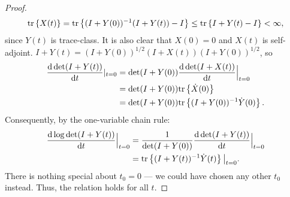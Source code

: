 \begin{proof}
  \begin{align*}
    \textup{tr}\left \{X(t) \right \} = \textup{tr}\left \{(I+Y(0))^{-1} (I+Y(t)) - I \right \}
    \leq \textup{tr}\left \{I+Y(t) - I \right \}< \infty,
  \end{align*}
  since $Y(t)$ is trace-class. It is also clear that
  $X(0) = 0$ and $X(t)$ is self-adjoint.
  $I+Y(t) = (I+Y(0))^{1/2}(I+X(t))(I+Y(0))^{1/2}$, so
  \begin{align*}
    \frac{\text{\textup{d}} \det (I+Y(t))}{\text{\textup{d}} t}|_{t=0} 
    &= \det (I+Y(0))\frac{\text{\textup{d}} \det (I+X(t))}{\text{\textup{d}} t}\Big |_{t=0} \\
    &= \det (I+Y(0)) \textup{tr}\left \{\dot{X}(0) \right \} \\
    &= \det (I+Y(0)) \textup{tr}\left \{(I+Y(0))^{-1} \dot{Y}(0) \right \}.
  \end{align*}
  Consequently, by the one-variable chain rule:
  \begin{align*}
    \frac{\text{\textup{d}} \log \det (I+Y(t))}{\text{\textup{d}} t}\Big |_{t=0} &=
    \frac{1}{\det (I+Y(0))}\frac{\text{\textup{d}} \det (I+Y(t))}{\text{\textup{d}} t}\Big |_{t=0} \\ 
    &= \textup{tr}\left \{ (I+Y(t))^{-1} \dot{Y}(t) \right \} \big |_{t=0}.
  \end{align*}
  There is nothing special about $t_0 = 0$ --- we could have chosen
  any other $t_0$ instead. Thus, the relation holds for all $t$.
\end{proof}



